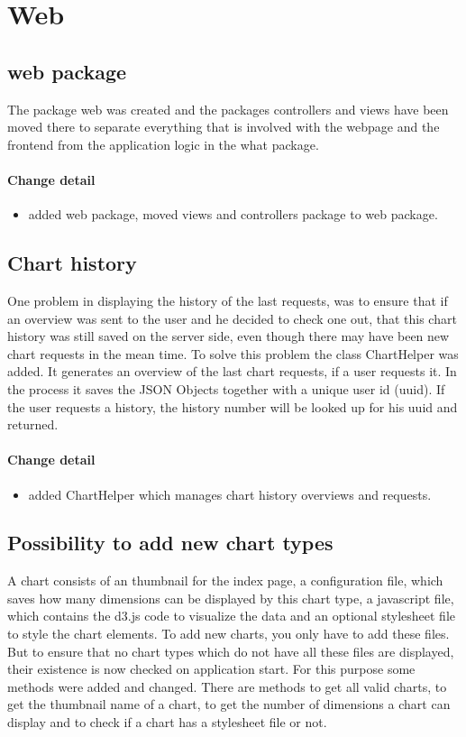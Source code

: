 \section{Web}
\subsection{web package}
The package web was created and the packages controllers
 and views have been moved there to separate everything that is involved with the webpage 
 and the frontend from the application logic in the what package.

\paragraph{Change detail}
\begin{itemize}
  \item added web package, moved views and controllers package to web package.
\end{itemize}

\subsection{Chart history}
One problem in displaying the history of the last requests, 
was to ensure that if an overview was sent to the user and he decided to check one out, 
that this chart history was still saved on the server side, even though there may have been new chart requests in the mean time.
To solve this problem the class ChartHelper was added. It generates an overview of the last chart requests, 
if a user requests it. In the process it saves the JSON Objects together with a unique user id (uuid). 
If the user requests a history, the history number will be looked up for his uuid and returned.

\paragraph{Change detail}
\begin{itemize}
  \item added ChartHelper which manages chart history overviews and requests.
\end{itemize}

\subsection{Possibility to add new chart types}
A chart consists of an thumbnail for the index page, a configuration file, 
which saves how many dimensions can be displayed by this chart type,
a javascript file, which contains the d3.js code to visualize the data and an optional stylesheet file to style the chart elements.
To add new charts, you only have to add these files.
But to ensure that no chart types which do not have all these files are displayed, their existence is now checked on application start.
For this purpose some methods were added and changed. There are methods to get all valid charts, to get the thumbnail name of a chart,
to get the number of dimensions a chart can display and to check if a chart has a stylesheet file or not.

